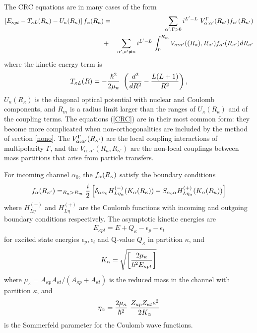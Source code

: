 \documentclass[11pt,a4paper]{article}
\begin{document}
The CRC equations are in many cases of the form
\begin{eqnarray} \nonumber
\left [ E_{\kappa pt } - T_{\kappa L } {(R_\kappa)} - U_\kappa {(R_\kappa)} \right ]
       f_\alpha {(R_\kappa)}  &=& \sum_{\alpha' , \Gamma> 0 }
           { i ^ {L' - L} ~
           V^\Gamma_{\alpha :\alpha' } {(R_{\kappa'})}  f_{\alpha'} {(R_{\kappa'})} }
\\
  &+ & \sum_{\alpha' ,\kappa' \neq\kappa } i ^ {L' - L} ~
   {\int_ 0 ^ {R_m }
     { V_{\alpha :\alpha' }( {(R_\kappa)} , {R_{\kappa'}} )
          f_{\alpha'} (R_{\kappa'})
            d R_{\kappa'} }}\label{CRC}
\end{eqnarray}
where the kinetic energy term is
\begin{eqnarray}
   T_{\kappa L} (R) = - {\hbar^2 \over {2 \mu_\kappa}} ~
       \left ( {d^2 \over dR^2} - {{L(L+1)} \over R^2} \right ) ,
\end{eqnarray}
$U_\kappa (R_\kappa)$ is the diagonal optical potential
with nuclear and Coulomb components,
and $R_m$ is a radius limit larger than the ranges of
$U_\kappa (R_\kappa)$ and of the coupling terms.
The equations (\ref{CRC}) are in their most common form:
they become more complicated when
non-orthogonalities are included by the method of section \ref{nono}.
The $   V^\Gamma_{\alpha :\alpha' } {(R_{\kappa'})} $ are the local
coupling interactions of multipolarity $\Gamma$, and the
$ V_{\alpha :\alpha' }( R_\kappa , {R_{\kappa'}} ) $
are the non-local couplings between mass
partitions that arise from particle transfers.

For incoming channel $\alpha_0$, the
$ f_\alpha {(R_\kappa)}$
satisfy the boundary conditions
\begin{eqnarray} \label{asymp}
 f_\alpha {(R_{\kappa'})} = _ {R_\kappa > R_m }
  {i \over 2} \left [ \delta_{\alpha\alpha_0 }
             H^{(-)}_{L {\eta _\alpha}} ( K_\alpha {(R_\kappa)} )
    - S_{\alpha_0\alpha }
             H^{(+)}_{L {\eta _\alpha}} ( K_\alpha {(R_\kappa)} )
      \right ]
\end{eqnarray}
where
$ H^{(-)}_{L \eta}$
and
$ H^{(+)}_{L \eta}$
are the Coulomb functions \cite{COULCC}
with incoming and outgoing boundary conditions
respectively.
The asymptotic kinetic energies are
\begin{eqnarray}
     E_{\kappa pt} = E + Q_\kappa - \epsilon_p - \epsilon_t
\end{eqnarray}
for excited state energies
$ \epsilon_p , \epsilon_t$
and Q-value $ Q_\kappa$
in partition $\kappa$, and
\begin{eqnarray}
   K_\alpha = \sqrt {\left [ {2 \mu_\kappa} \over {\hbar^2}
                      E_{\kappa pt}  \right ] }
                      \end{eqnarray}
where
$
\mu_\kappa =
  A_{\kappa p} A_{\kappa t} / (A_{\kappa p} +  A_{\kappa t})
$
is the reduced mass in the channel with partition $\kappa$,
and
\begin{eqnarray} \label{EQeta}
  \eta _\alpha = {{2 \mu_\kappa} \over \hbar^2} ~
            { Z_{\kappa p} Z_{\kappa t} e^2  \over 2 K _\alpha }
\end{eqnarray}
is the Sommerfeld parameter for the Coulomb wave functions.
\end{document}
